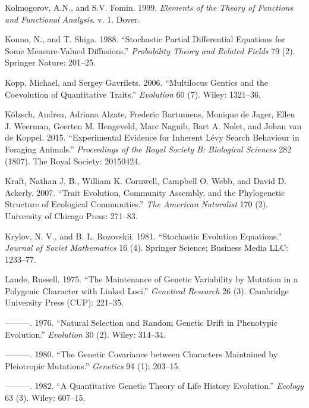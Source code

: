\documentclass[]{article}
\begin{document}
\leavevmode\hypertarget{ref-kolmogorov1999elements}{}%
Kolmogorov, A.N., and S.V. Fomin. 1999. \emph{Elements of the Theory of
Functions and Functional Analysis}. v. 1. Dover.

\leavevmode\hypertarget{ref-Konno1988}{}%
Konno, N., and T. Shiga. 1988. ``Stochastic Partial Differential
Equations for Some Measure-Valued Diffusions.'' \emph{Probability Theory
and Related Fields} 79 (2). Springer Nature: 201--25.

\leavevmode\hypertarget{ref-Kopp2006}{}%
Kopp, Michael, and Sergey Gavrilets. 2006. ``Multilocus Gentics and the
Coevolution of Quantitative Traits.'' \emph{Evolution} 60 (7). Wiley:
1321--36.

\leavevmode\hypertarget{ref-Klzsch2015}{}%
Kölzsch, Andrea, Adriana Alzate, Frederic Bartumeus, Monique de Jager,
Ellen J. Weerman, Geerten M. Hengeveld, Marc Naguib, Bart A. Nolet, and
Johan van de Koppel. 2015. ``Experimental Evidence for Inherent Lévy
Search Behaviour in Foraging Animals.'' \emph{Proceedings of the Royal
Society B: Biological Sciences} 282 (1807). The Royal Society: 20150424.

\leavevmode\hypertarget{ref-Kraft2007}{}%
Kraft, Nathan J. B., William K. Cornwell, Campbell O. Webb, and David D.
Ackerly. 2007. ``Trait Evolution, Community Assembly, and the
Phylogenetic Structure of Ecological Communities.'' \emph{The American
Naturalist} 170 (2). University of Chicago Press: 271--83.

\leavevmode\hypertarget{ref-Krylov1981}{}%
Krylov, N. V., and B. L. Rozovskii. 1981. ``Stochastic Evolution
Equations.'' \emph{Journal of Soviet Mathematics} 16 (4). Springer
Science; Business Media LLC: 1233--77.

\leavevmode\hypertarget{ref-Lande1975}{}%
Lande, Russell. 1975. ``The Maintenance of Genetic Variability by
Mutation in a Polygenic Character with Linked Loci.'' \emph{Genetical
Research} 26 (3). Cambridge University Press (CUP): 221--35.

\leavevmode\hypertarget{ref-Lande1976}{}%
---------. 1976. ``Natural Selection and Random Genetic Drift in
Phenotypic Evolution.'' \emph{Evolution} 30 (2). Wiley: 314--34.

\leavevmode\hypertarget{ref-pmid17248993}{}%
---------. 1980. ``The Genetic Covariance between Characters Maintained
by Pleiotropic Mutations.'' \emph{Genetics} 94 (1): 203--15.

\leavevmode\hypertarget{ref-Lande1982}{}%
---------. 1982. ``A Quantitative Genetic Theory of Life History
Evolution.'' \emph{Ecology} 63 (3). Wiley: 607--15.
\end{document}
